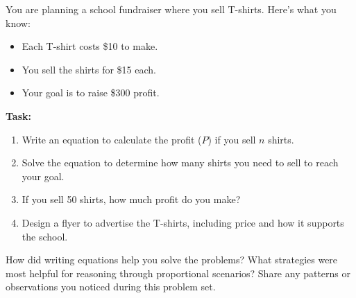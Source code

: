 \documentclass[12pt]{article}
\begin{document}
\vspace{1em}
\begin{tcolorbox}[colframe=black!60, colback=white, 
coltitle=black, colbacktitle=black!15, fonttitle=\bfseries\Large, 
title=Performance Task: Planning a School Fundraiser, halign title=center, left=10pt, right=10pt, top=10pt, bottom=50pt]
You are planning a school fundraiser where you sell T-shirts. Here’s what you know:
\begin{itemize}
    \item Each T-shirt costs \$10 to make.
    \item You sell the shirts for \$15 each.
    \item Your goal is to raise \$300 profit.
\end{itemize}
\textbf{Task:}
\begin{enumerate}[itemsep=3em]
    \item Write an equation to calculate the profit (\(P\)) if you sell \(n\) shirts.
    \item Solve the equation to determine how many shirts you need to sell to reach your goal.
    \item If you sell 50 shirts, how much profit do you make?
    \item Design a flyer to advertise the T-shirts, including price and how it supports the school.
\end{enumerate}
\end{tcolorbox}

\vspace{1em}
\begin{tcolorbox}[colframe=black!60, colback=white, 
coltitle=black, colbacktitle=black!15, fonttitle=\bfseries\Large, 
title=Reflection, halign title=center, left=10pt, right=10pt, top=10pt, bottom=100pt]
How did writing equations help you solve the problems? What strategies were most helpful for reasoning through proportional scenarios? Share any patterns or observations you noticed during this problem set.
\end{tcolorbox}
\end{document}
